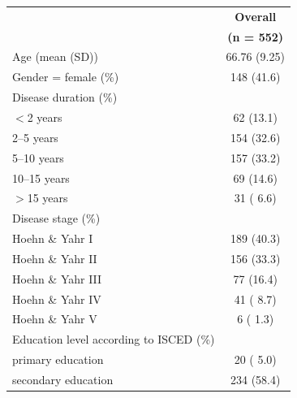 \documentclass{bmcart}
\begin{document}
\begin{table}[!ht]
\begin{tabular}{p{5cm} c}
\toprule
																	&	\textbf{Overall}	\\ %
																	& 	\textbf{(n = 552)}\\ 
\midrule
Age (mean (SD)) 															& 	66.76 (9.25) 	\\ \hline
Gender = female (\%) 														&  	148 (41.6)  		\\ \hline
Disease duration (\%) 														& 				\\ \hline
\hspace{3mm} $<$2 years 													& 	62 (13.1) 		\\ \hline
\hspace{3mm} 2--5 years 													& 	154 (32.6) 		\\ \hline
\hspace{3mm} 5--10 years 													& 	157 (33.2) 		\\ \hline
\hspace{3mm} 10--15 years 													& 	69 (14.6) 		\\ \hline
\hspace{3mm} $>$15 years													& 	31 ( 6.6) 		\\ \hline
Disease stage (\%)														& 				\\ \hline
\hspace{3mm} Hoehn \& Yahr I 												&  	189 (40.3) 		\\ \hline
\hspace{3mm} Hoehn \& Yahr II 												& 	156 (33.3)  		\\ \hline
\hspace{3mm} Hoehn \& Yahr III  												&   	77 (16.4) 		\\ \hline
\hspace{3mm} Hoehn \& Yahr IV  												& 	41 ( 8.7) 		\\ \hline
\hspace{3mm} Hoehn \& Yahr V  												&     	6 ( 1.3) 		\\ \hline
Education level according \newline to ISCED (\%) 									& 				\\ \hline
\hspace{3mm} primary education  												& 	20 ( 5.0) 		\\ \hline
\hspace{3mm} secondary education 						 					& 	234 (58.4)		\\ \hline

\end{tabular}
\end{table}
\end{document}
